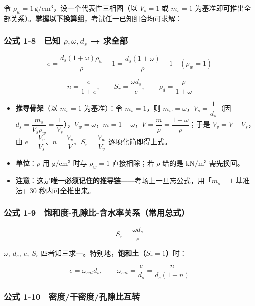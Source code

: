 \documentclass[
]{article}
\providecommand{\tightlist}{%
  \setlength{\itemsep}{0pt}\setlength{\parskip}{0pt}}
\begin{document}
令 \(\rho_w=1\,\mathrm{g/cm^3}\)，设一个代表性三相图（以 \(V_s=1\) 或
\(m_s=1\)
为基准即可推出全部关系）。\textbf{掌握以下换算组}，考试任一已知组合均可求解：

\subsubsection{\texorpdfstring{公式 1-8　已知 \(\rho,\omega,d_s\) →
求全部}{公式 1-8　已知 \textbackslash rho,\textbackslash omega,d\_s → 求全部}}\label{ux516cux5f0f-1-8-ux5df2ux77e5-rhoomegad_s-ux6c42ux5168ux90e8}

\[e=\frac{d_s(1+\omega)\rho_w}{\rho}-1=\frac{d_s(1+\omega)}{\rho}-1\quad(\rho_w=1)\]

\[n=\frac{e}{1+e},\qquad S_r=\frac{\omega d_s}{e},\qquad \rho_d=\frac{\rho}{1+\omega}\]

\begin{itemize}
\tightlist
\item
  \textbf{推导骨架}（以 \(m_s=1\) 为基准）：令 \(m_s=1\)，则
  \(m_w=\omega\)，\(V_s=\dfrac{1}{d_s}\)（因
  \(d_s=\dfrac{m_s}{V_s\rho_w}=\dfrac{1}{V_s}\)），\(V_w=\omega\)，\(m=1+\omega\)，\(V=\dfrac{m}{\rho}=\dfrac{1+\omega}{\rho}\)；于是
  \(V_v=V-V_s\)，由
  \(e=\dfrac{V_v}{V_s}\)、\(n=\dfrac{V_v}{V}\)、\(S_r=\dfrac{V_w}{V_v}\)
  逐项化简即得上式。
\item
  \textbf{单位}：\(\rho\) 用 \(\mathrm{g/cm^3}\) 时与 \(\rho_w=1\)
  直接相除；若 \(\rho\) 给的是 \(\mathrm{kN/m^3}\) 需先换回。
\item
  \textbf{注意}：这是\textbf{唯一必须记住的推导链}------考场上一旦忘公式，用「\(m_s=1\)
  基准法」30 秒内可全推出来。
\end{itemize}

\subsubsection{公式
1-9　饱和度-孔隙比-含水率关系（常用总式）}\label{ux516cux5f0f-1-9-ux9971ux548cux5ea6-ux5b54ux9699ux6bd4-ux542bux6c34ux7387ux5173ux7cfbux5e38ux7528ux603bux5f0f}

\[\boxed{S_r=\frac{\omega d_s}{e}}\]

\(\omega,\ d_s,\ e,\ S_r\)
四者知三求一。特别地，\textbf{饱和土（\(S_r=1\)）}时：

\[e=\omega_{sat} d_s,\qquad \omega_{sat}=\frac{e}{d_s}=\frac{n}{d_s(1-n)}\]

\subsubsection{公式
1-10　密度/干密度/孔隙比互转}\label{ux516cux5f0f-1-10-ux5bc6ux5ea6ux5e72ux5bc6ux5ea6ux5b54ux9699ux6bd4ux4e92ux8f6c}
\end{document}
